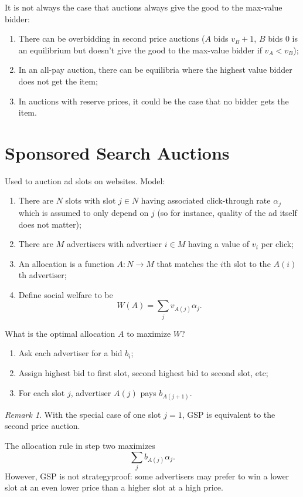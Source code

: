\documentclass[dvipsnames]{article}
\theoremstyle{definition}
\theoremstyle{remark}
\newtheorem*{remark}{Remark}
\newenvironment{mech}[1]{\begin{tcolorbox}[colback=red!5!white,colframe=red!75!black,title={#1}]}{\end{tcolorbox}}
\begin{document}
It is not always the case that auctions always give the good to the max-value bidder:
\begin{enumerate}
	\item There can be overbidding in second price auctions ($A$ bids $v_B+1$, $B$ bids $0$ is an equilibrium but doesn't give the good to the max-value bidder if $v_A < v_B$);
	\item In an all-pay auction, there can be equilibria where the highest value bidder does not get the item;
	\item In auctions with reserve prices, it could be the case that no bidder gets the item.
\end{enumerate}


\newpage

\section{Sponsored Search Auctions}

Used to auction ad slots on websites. Model:
\begin{enumerate}
	\item There are $N$ slots with slot $j \in N$ having associated click-through rate $\alpha_j$ which is assumed to only depend on $j$ (so for instance, quality of the ad itself does not matter);
	\item There are $M$ advertisers with advertiser $i \in M$ having a value of $v_i$ per click;
	\item An allocation is a function $A: N \to M$ that matches the $i$th slot to the $A(i)$th advertiser;
	\item Define social welfare to be
	$$W(A) = \sum_j v_{A(j)} \alpha_j.$$
\end{enumerate}
What is the optimal allocation $A$ to maximize $W$?

\begin{mech}{General Second Price Auction}
	\begin{enumerate}
		\item Ask each advertiser for a bid $b_i$;
		\item Assign highest bid to first slot, second highest bid to second slot, etc;
		\item For each slot $j$, advertiser $A(j)$ pays $b_{A(j+1)}$.
	\end{enumerate}
\end{mech}

\begin{remark}
	With the special case of one slot $j=1$, GSP is equivalent to the second price auction.
\end{remark}
The allocation rule in step two maximizes
$$\sum_j b_{A(j)}\alpha_j.$$
However, GSP is not strategyproof: some advertisers may prefer to win a lower slot at an even lower price than a higher slot at a high price. 
\end{document}
